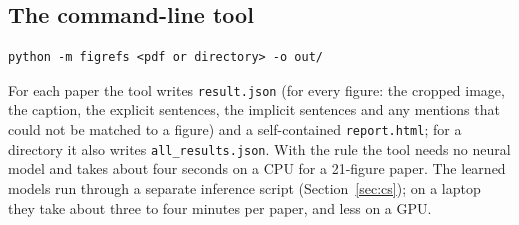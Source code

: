 \subsection{The command-line tool}
\begin{Verbatim}[fontsize=\small,frame=single,framesep=6pt,rulecolor=\color{navy!30}]
python -m figrefs <pdf or directory> -o out/
\end{Verbatim}
For each paper the tool writes \texttt{result.json} (for every figure: the cropped image, the caption, the
explicit sentences, the implicit sentences and any mentions that could not be matched to a figure) and a
self-contained \texttt{report.html}; for a directory it also writes \texttt{all\_results.json}. With the rule
\bof{} the tool needs no neural model and takes about four seconds on a CPU for a 21-figure paper. The learned
models run through a separate inference script (Section~\ref{sec:cs}); on a laptop they take about three to
four minutes per paper, and less on a GPU.
